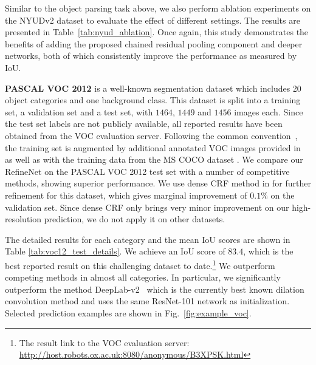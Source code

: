 \documentclass[10pt,twocolumn,letterpaper]{article}
\newcommand{\Fig}{Fig.\xspace}
\newcommand{\myparagraph}[1]{\vspace{.5em}\noindent\textbf{#1}}
\begin{document}
Similar to the object parsing task above, we also perform ablation experiments on the NYUDv2 dataset to evaluate the effect of different settings. The results are presented in Table~\ref{tab:nyud_ablation}.
Once again, this study demonstrates the benefits of adding the proposed chained residual pooling component and deeper networks, both of which consistently improve the performance as measured by IoU.

\myparagraph{PASCAL VOC 2012}\cite{everingham2010pascal} is a well-known segmentation dataset which includes 20 object categories and one background class.
This dataset is split into a training set, a validation set and a test set,
with $1464$, $1449$ and $1456$ images each. 
Since the test set labels are not publicly available, all reported results have been obtained from the VOC evaluation server.
Following the common convention~\cite{ChenPKMY14,ChenPK0Y16,zheng2015conditional,LiuDPN}, 
the training set is augmented by additional annotated VOC images provided in \cite{HariharanABMM11} as well as with the training data from the MS COCO dataset \cite{lin2014microsoft}.
We compare our RefineNet on the PASCAL VOC 2012 test set with
a number of competitive methods, showing superior performance.
We use dense CRF method in \cite{krahenbuhl2012efficient} for further refinement for this dataset, which gives marginal improvement of $0.1\%$ on the validation set.
Since dense CRF only brings very minor improvement on our high-resolution prediction, we do not apply it on other datasets.

The detailed results for each category and the mean IoU scores are shown in Table \ref{tab:voc12_test_details}.
We achieve an IoU score of $83.4$, which is the best reported result on this challenging dataset to date.\footnote{The result link to the VOC evaluation server: \url{http://host.robots.ox.ac.uk:8080/anonymous/B3XPSK.html}}
We outperform competing methods in almost all categories. 
In particular, we significantly outperform the method DeepLab-v2~\cite{ChenPK0Y16} which is the currently best known dilation convolution method and uses the same ResNet-101 network as initialization.
Selected prediction examples are shown in \Fig~\ref{fig:example_voc}.
\end{document}
